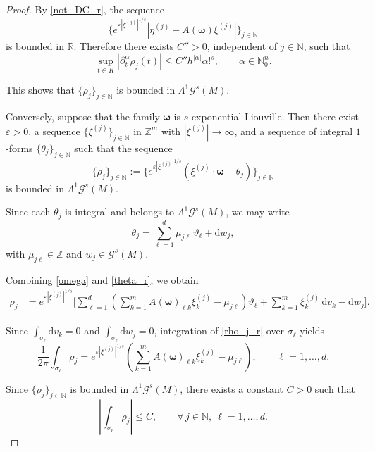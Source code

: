 \documentclass[10pt,a4paper]{amsart}
\begin{document}
\begin{proof}
	By \eqref{not_DC_r}, the sequence
	\[
	\big\{ e^{\varepsilon|\xi^{(j)}|^{1/s}} |\eta^{(j)} + A(\boldsymbol{\omega})\xi^{(j)}|	\big\}_{j\in\mathbb{N}}
	\]
	is bounded in $\mathbb{R}$. Therefore there exists $C''>0$, independent of $j\in\mathbb{N}$, such that
	\[
	\sup_{t\in K} |\partial_t^\alpha \rho_j(t)| 
	\le C'' h^{|\alpha|}\alpha!^s, \qquad \alpha\in\mathbb{N}_0^n.
	\]
	
	This shows that $\{\rho_j\}_{j\in\mathbb{N}}$ is bounded in $\mathsf{\Lambda}^1\mathscr{G}^s(M)$.
	
	
	\medskip
	
	Conversely, suppose that the family $\boldsymbol{\omega}$ is $s$-exponential Liouville.  Then there exist $\varepsilon>0$, a sequence $\{\xi^{(j)}\}_{j\in\mathbb{N}} $ in $\mathbb{Z}^m$ with $|\xi^{(j)}|\to\infty$, and a sequence of integral $1$-forms $\{\theta_j\}_{j\in\mathbb{N}}$ such that the sequence
	\[
	\{\rho_j\}_{j\in\mathbb{N}} := \big\{e^{\varepsilon|\xi^{(j)}|^{1/s}} (\xi^{(j)} \cdot \boldsymbol{\omega} - \theta_j)\big\}_{j\in\mathbb{N}}
	\]
	is bounded in $\mathsf{\Lambda}^1 \mathscr{G}^s(M)$.
	
	Since each $\theta_j$ is integral and belongs to $\mathsf{\Lambda}^1\mathscr{G}^s(M)$, we may write
	\begin{equation}\label{theta_r}
		\theta_j = \sum_{\ell=1}^{d} \mu_{j\ell}\,\vartheta_\ell + \mathrm{d}w_j,
	\end{equation}
	with $\mu_{j\ell} \in \mathbb{Z}$ and $w_j \in \mathscr{G}^s(M)$.
	
	Combining \eqref{omega} and \eqref{theta_r}, we obtain
	\begin{align}
		\rho_j &= e^{\varepsilon|\xi^{(j)}|^{1/s}} \Bigg[ \sum_{\ell=1}^{d}
		\left(\sum_{k=1}^{m} A(\boldsymbol{\omega})_{\ell k}\xi^{(j)}_k
		- \mu_{j\ell} \right) \vartheta_\ell + \sum_{k=1}^{m}\xi^{(j)}_k\,\mathrm{d}v_k
		- \mathrm{d}w_j \Bigg]. \label{rho_j_r}
	\end{align}
	
	Since $\int_{\sigma_\ell} \mathrm{d}v_k = 0$ and $\int_{\sigma_\ell} \mathrm{d}w_j = 0$, 
	integration of \eqref{rho_j_r} over $\sigma_\ell$ yields
	\[
	\frac{1}{2\pi} \int_{\sigma_\ell} \rho_j = e^{\varepsilon|\xi^{(j)}|^{1/s}} \left( \sum_{k=1}^{m}
	A(\boldsymbol{\omega})_{\ell k}\xi^{(j)}_k - \mu_{j\ell} \right), \qquad \ell=1,\dots,d.
	\]

	Since $\{\rho_j\}_{j\in\mathbb{N}}$ is bounded in $\mathsf{\Lambda}^1 \mathscr{G}^s(M)$, there exists a constant $C>0$ such that
	\[
	\left| \int_{\sigma_\ell} \rho_j \right| \le C, \qquad \forall\, j\in\mathbb{N},\ \ell=1,\dots,d.
	\]
	

\end{proof}
\end{document}
